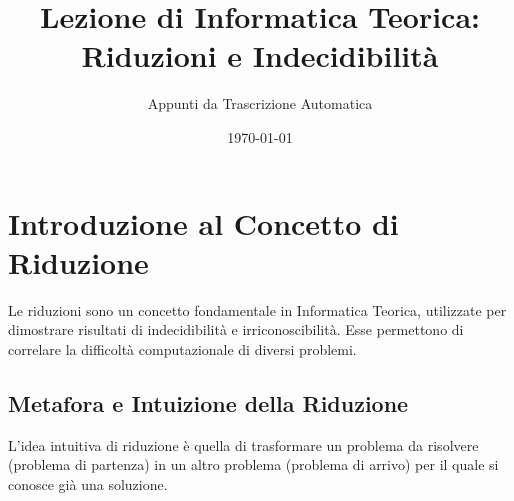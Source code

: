 \documentclass[a4paper]{article}
\title{Lezione di Informatica Teorica: Riduzioni e Indecidibilità}
\author{Appunti da Trascrizione Automatica}
\date{\today}
\theoremstyle{definition} %
\begin{document}
\maketitle
\tableofcontents
\newpage

\section{Introduzione al Concetto di Riduzione}

Le riduzioni sono un concetto fondamentale in Informatica Teorica, utilizzate per dimostrare risultati di indecidibilità e irriconoscibilità. Esse permettono di correlare la difficoltà computazionale di diversi problemi.

\subsection{Metafora e Intuizione della Riduzione}
L'idea intuitiva di riduzione è quella di trasformare un problema da risolvere (problema di partenza) in un altro problema (problema di arrivo) per il quale si conosce già una soluzione.
\end{document}
